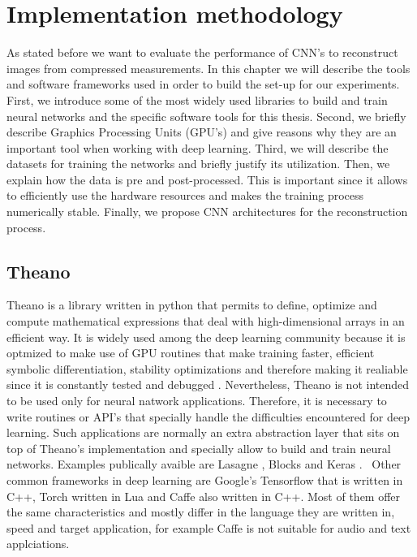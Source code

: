 \chapter{Implementation methodology}
As stated before we want to evaluate the performance of CNN's to reconstruct images from compressed measurements. In this chapter we will describe the tools and software frameworks used in order to build the set-up for our experiments. First,  we introduce some of the most widely used libraries to build and train neural networks and the specific software tools for this thesis. Second, we briefly describe Graphics Processing Units (GPU's) and give reasons why they are an important tool when working with deep learning. Third, we will describe the datasets for training the networks and briefly justify its utilization. Then, we explain how the data is pre and post-processed. This is important since it allows to efficiently use the hardware resources and makes the training process numerically stable. Finally, we propose CNN architectures for the reconstruction process.   

\section{Theano}
Theano is a library written in python that permits to define, optimize and compute mathematical expressions that deal with high-dimensional arrays in an efficient way. It is widely used among the deep learning community because it is optmized to make use of GPU routines that make training faster, efficient symbolic differentiation, stability optimizations and therefore making it realiable since it is constantly tested and debugged \cite{2016arXiv160502688short}. Nevertheless, Theano is not intended to be used only for neural natwork applications. Therefore, it is necessary to write routines or API's that specially handle the difficulties encountered for deep learning. Such applications are normally an extra abstraction layer that sits on top of Theano's implementation and specially allow to build and train neural networks. Examples publically avaible are Lasagne \cite{sander_dieleman_2015_27878}, Blocks \cite{van2015blocks} and Keras \cite{chollet2015keras}. \
Other common frameworks in deep learning are Google's Tensorflow \cite{tensorflow2015-whitepaper} that is written in C++, Torch \cite{torch} written in Lua and Caffe \cite{jia2014caffe} also written in C++. Most of them offer the same characteristics and mostly differ in the language they are written in, speed and target application, for example Caffe is not suitable for audio and text applciations.      

